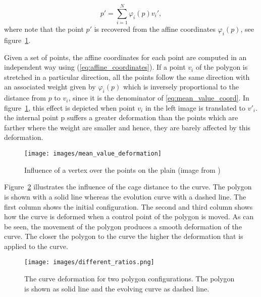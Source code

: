 \begin{equation} \label{eq:deform_points}
p' = \sum_{i=1}^{N}\varphi_i(p)v_{i}',
\end{equation}
where note that the point $p'$ is recovered from the affine
coordinates $\varphi_i(p)$, see figure~\ref{fig:mean_value_deformation}.


Given a set of points, the affine coordinates for each
point are computed in an independent way using (\ref{eq:affine_coordinates}).
If a point $v_i$ of the polygon is stretched in a particular
direction, all the points follow the same direction with an
associated weight given by $\varphi_i(p)$ which is inversely proportional to the distance from $p$ to $v_i$, since it is the denominator of  \eqref{eq:mean_value_coord}. In figure~\ref{fig:mean_value_deformation}, this effect is depicted when point $v_i$ in the left image is translated to $v'_i$. the internal point p suffers a greater deformation
than the points which are farther where the weight are smaller and hence, they
are barely affected by this deformation.

\begin{figure}[h]
	\centering
	{\texttt{[image: images/mean\_value\_deformation]}}
	\caption{Influence of a vertex over the points on the plain (image from \cite{ipcac2015})}
	\label{fig:mean_value_deformation}
\end{figure}

Figure~\ref{fig:different_ratios} illustrates the influence of the cage distance
to the curve. The polygon is shown with a solid line whereas the evolution curve with a dashed
line. The first column shows the initial configuration.
The second and third column shows how the curve is deformed when a control
point of the polygon is moved. As can be seen, the movement of the polygon
produces a smooth deformation of the curve. The closer the polygon to the curve
the higher the deformation that is applied to the curve.

\begin{figure}[h!]
	\centering
	{\texttt{[image: images/different\_ratios.png]}}
	\caption{The curve deformation for two polygon configurations. The
		polygon is shown as solid line and the evolving curve as dashed line.}
	\label{fig:different_ratios}
\end{figure}


